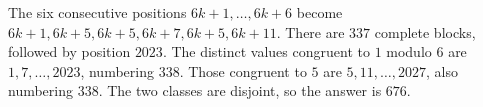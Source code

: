 The six consecutive positions $6k+1,\ldots,6k+6$ become $6k+1,6k+5,6k+5,6k+7,6k+5,6k+11$. There are $337$ complete blocks, followed by position $2023$. The distinct values congruent to $1$ modulo $6$ are $1,7,\ldots,2023$, numbering $338$. Those congruent to $5$ are $5,11,\ldots,2027$, also numbering $338$. The two classes are disjoint, so the answer is $\boxed{676}$.
